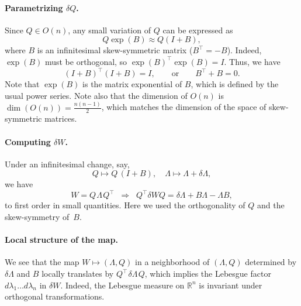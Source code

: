 \documentclass[letterpaper,11pt,oneside,reqno]{book}
\numberwithin{equation}{chapter}  %
\newcommand{\ssp}{\hspace{1pt}}
\theoremstyle{definition}
\begin{document}
\paragraph{Parametrizing \(\delta Q\).}
Since \( Q \in O(n) \), any small variation of \( Q \) can be expressed as
\[ Q \exp(B) \approx Q(I + B), \] where \( B \) is an infinitesimal
skew-symmetric matrix (\( B^\top = -B \)). Indeed,
$\exp(B)$ must be orthogonal, so $\exp(B)^\top \exp(B) = I$.
Thus, we have
\begin{equation*}
	(I+B)^\top(I+B)=I,\qquad \text{or}\qquad B^\top + B = 0.
\end{equation*}
Note that $\exp(B)$ is the matrix exponential of $B$,
which is defined by the usual power series.
Note also that the dimension of \( O(n) \)
is \( \dim(O(n)) = \frac{n(n-1)}{2} \), which matches the dimension of the
space of skew-symmetric matrices.

\paragraph{Computing \(\delta W\).}
Under an infinitesimal change, say,
\[
  Q \mapsto Q\,(I + B),
  \quad
  \Lambda \mapsto \Lambda + \delta\Lambda,
\]
we have
\[
  W
  = Q\ssp\Lambda\ssp Q^\top
  \;\;\Longrightarrow\;\;
  Q^\top \delta W Q
	=
	\delta\Lambda
	+
	B\Lambda-\Lambda B,
\]
to first order in small quantities.
Here we used the orthogonality of $Q$ and
the skew-symmetry of~$B$.

\paragraph{Local structure of the map.}

We see that the map
$W\mapsto(\Lambda,Q)$
in a neighborhood of $(\Lambda,Q)$ determined by
$\delta \Lambda$ and $B$
locally translates by $Q^\top\ssp\delta \Lambda\ssp Q$,
which implies the Lebesgue factor
$d\lambda_1 \ldots d\lambda_n $
in $\delta W$. Indeed, the Lebesgue measure
on $\mathbb{R}^n$ is invariant under orthogonal transformations.
\end{document}
